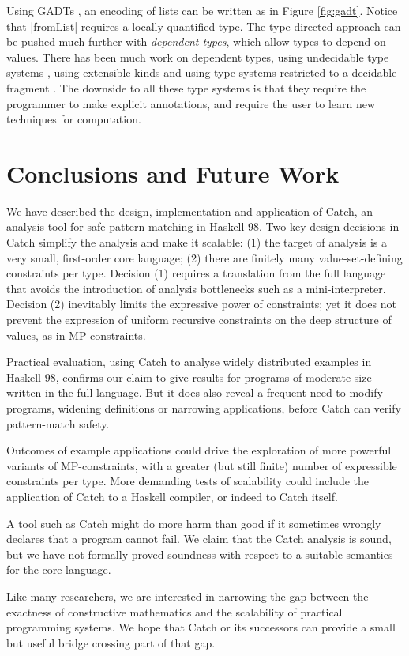 \documentclass[preprint]{sigplanconf}
\begin{document}
Using GADTs \cite{spj:gadt}, an encoding of lists can be written as in Figure \ref{fig:gadt}. Notice that |fromList| requires a locally quantified type. The type-directed approach can be pushed much further with \textit{dependent types}, which allow types to depend on values. There has been much work on dependent types, using undecidable type systems \cite{epigram}, using extensible kinds \cite{omega} and using type systems restricted to a decidable fragment \cite{xi:dependent_practical}. The downside to all these type systems is that they require the programmer to make explicit annotations, and require the user to learn new techniques for computation.


\section{Conclusions and Future Work}
\label{sec:conclusion}

We have described the design, implementation and application of Catch,
an analysis tool for safe pattern-matching in Haskell 98.  Two key
design decisions in Catch simplify the analysis and make it scalable:
(1) the target of analysis is a very small, first-order core language;
(2) there are finitely many value-set-defining constraints per type.
Decision (1) requires a translation from the full language that avoids
the introduction of analysis bottlenecks such as a mini-interpreter.
Decision (2) inevitably limits the expressive power of
constraints; yet it does not prevent the expression of uniform recursive
constraints on the deep structure of values, as in MP-constraints.

Practical evaluation, using Catch to analyse widely distributed examples
in Haskell 98, confirms our claim to give results for programs of moderate
size written in the full language. But it does also reveal a frequent need
to modify programs, widening definitions or narrowing applications,
before Catch can verify pattern-match safety.

Outcomes of example applications could drive the exploration of more
powerful variants of MP-constraints, with a greater (but still finite)
number of expressible constraints per type.  More demanding tests of
scalability could include the application of Catch to a Haskell compiler,
or indeed to Catch itself.

A tool such as Catch might do more harm than good if it sometimes wrongly
declares that a program cannot fail.  We claim that the Catch analysis
is sound, but we have not formally proved soundness with respect to a
suitable semantics for the core language.

Like many researchers, we are interested in narrowing the gap between the
exactness of constructive mathematics and the scalability of practical
programming systems.  We hope that Catch or its successors can provide
a small but useful bridge crossing part of that gap.



\end{document}
